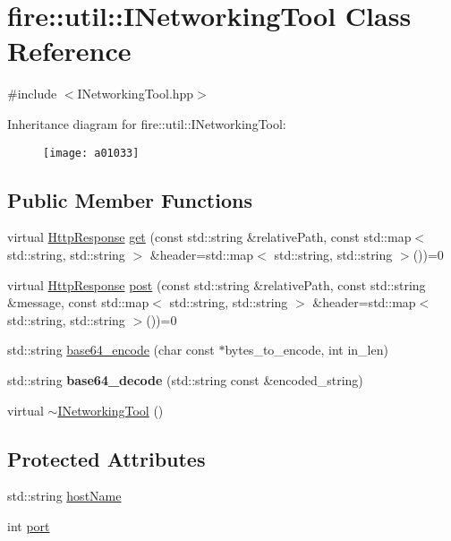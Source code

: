 \hypertarget{a01033}{}\section{fire\+:\+:util\+:\+:I\+Networking\+Tool Class Reference}
\label{a01033}


{\ttfamily \#include $<$I\+Networking\+Tool.\+hpp$>$}

Inheritance diagram for fire\+:\+:util\+:\+:I\+Networking\+Tool\+:\begin{figure}[H]
\begin{center}
\leavevmode
\texttt{[image: a01033]}
\end{center}
\end{figure}
\subsection*{Public Member Functions}
\begin{DoxyCompactItemize}
\item 
virtual \hyperlink{a01029}{Http\+Response} \hyperlink{a01033_a44b81ebf8421f0e32ed99b5e372ef007}{get} (const std\+::string \&relative\+Path, const std\+::map$<$ std\+::string, std\+::string $>$ \&header=std\+::map$<$ std\+::string, std\+::string $>$())=0
\item 
virtual \hyperlink{a01029}{Http\+Response} \hyperlink{a01033_ad6ff0e352d78f17a6f6184d1b80e0c94}{post} (const std\+::string \&relative\+Path, const std\+::string \&message, const std\+::map$<$ std\+::string, std\+::string $>$ \&header=std\+::map$<$ std\+::string, std\+::string $>$())=0
\item 
std\+::string \hyperlink{a01033_ab93be61530f01e64cb3c688976a6887b}{base64\+\_\+encode} (char const $\ast$bytes\+\_\+to\+\_\+encode, int in\+\_\+len)
\item 
\mbox{\label{a01033_ae050106ca2338332893606cea2f3881a}} 
std\+::string {\bfseries base64\+\_\+decode} (std\+::string const \&encoded\+\_\+string)
\item 
virtual \hyperlink{a01033_a2beca71d6ecb1688809f0e5e0548c17c}{$\sim$\+I\+Networking\+Tool} ()
\end{DoxyCompactItemize}
\subsection*{Protected Attributes}
\begin{DoxyCompactItemize}
\item 
std\+::string \hyperlink{a01033_ab7380b440faa49daffb65ca030380cde}{host\+Name}
\item 
int \hyperlink{a01033_ae640954c85632932a88037375a95abf4}{port}
\end{DoxyCompactItemize}


